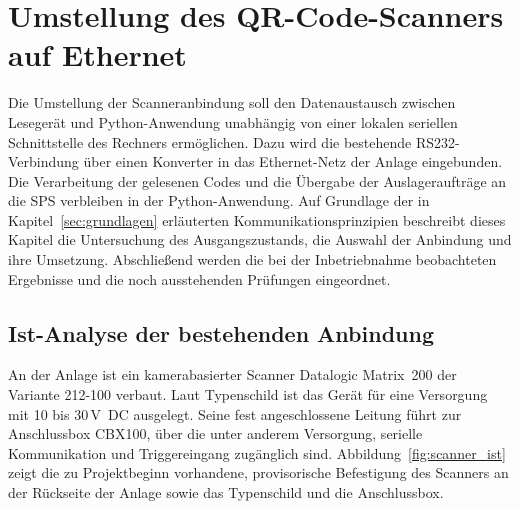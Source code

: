 
\section{Umstellung des QR-Code-Scanners auf Ethernet}
\label{sec:qr}

Die Umstellung der Scanneranbindung soll den Datenaustausch zwischen Lesegerät und Python-Anwendung unabhängig von einer lokalen seriellen Schnittstelle des Rechners ermöglichen. Dazu wird die bestehende RS232-Verbindung über einen Konverter in das Ethernet-Netz der Anlage eingebunden. Die Verarbeitung der gelesenen Codes und die Übergabe der Auslageraufträge an die SPS verbleiben in der Python-Anwendung. Auf Grundlage der in Kapitel~\ref{sec:grundlagen} erläuterten Kommunikationsprinzipien beschreibt dieses Kapitel die Untersuchung des Ausgangszustands, die Auswahl der Anbindung und ihre Umsetzung. Abschließend werden die bei der Inbetriebnahme beobachteten Ergebnisse und die noch ausstehenden Prüfungen eingeordnet.

\subsection{Ist-Analyse der bestehenden Anbindung}
\label{sec:qr_ist}

An der Anlage ist ein kamerabasierter Scanner Datalogic Matrix~200 der Variante 212-100 verbaut. Laut Typenschild ist das Gerät für eine Versorgung mit 10 bis 30\,V~DC ausgelegt. Seine fest angeschlossene Leitung führt zur Anschlussbox CBX100, über die unter anderem Versorgung, serielle Kommunikation und Triggereingang zugänglich sind. \cite{datalogic_cbx100_grundlagen} Abbildung~\ref{fig:scanner_ist} zeigt die zu Projektbeginn vorhandene, provisorische Befestigung des Scanners an der Rückseite der Anlage sowie das Typenschild und die Anschlussbox.

